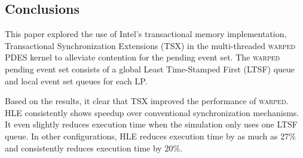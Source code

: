 \documentclass{sig-alternate}
\begin{document}

\subsection{Conclusions}\label{conclude}

This paper explored the use of Intel's transactional memory implementation, Transactional
Synchronization Extensions (TSX) in the multi-threaded \textsc{warped} PDES kernel to
alleviate contention for the pending event set.  The \textsc{warped} pending event set
consists of a global Least Time-Stamped First (LTSF) queue and local event set queues for
each LP.

Based on the results, it clear that TSX improved the performance of \textsc{warped}.  HLE
consistently shows speedup over conventional synchronization mechanisms.  It even slightly
reduces execution time when the simulation only uses one LTSF queue.  In other
configurations, HLE reduces execution time by as much as 27\% and consistently reduces
execution time by 20\%.
\end{document}
